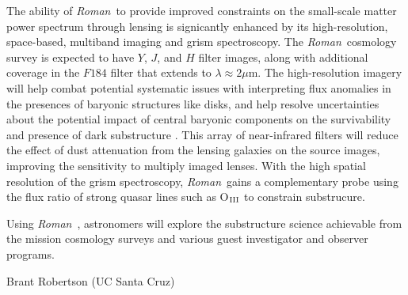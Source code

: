 \documentclass[11pt]{article}
\newcommand{\RST}{\emph{Roman}~}
\begin{document}
The ability of \RST to provide improved constraints on the small-scale matter power spectrum
through lensing is signicantly enhanced by its high-resolution, space-based, multiband imaging
and grism spectroscopy. The \RST cosmology survey is expected to have $Y$, $J$, and $H$ filter
images, along with additional coverage in the $F184$ filter that extends to $\lambda\approx2\mu$m.
The high-resolution imagery will help combat potential systematic issues with interpreting
flux anomalies in the presences of baryonic structures like disks\citep{hsueh2017a}, and
help resolve uncertainties about the potential impact of central baryonic components on the
survivability and presence of dark substructure \citep{garrison-kimmel2017a,graus2018a}.
This array of near-infrared filters will reduce the effect of dust attenuation from the lensing
galaxies on the source images, improving the sensitivity to multiply imaged lenses. With the
high spatial resolution of the
grism spectroscopy, \RST gains a complementary probe using the flux ratio of strong quasar lines
such as O$_{\rm{III}}$ to constrain substrucure\citep{nierenberg2017a}.

Using \RST, astronomers
will explore the substructure science achievable from the mission cosmology surveys and various 
guest investigator and observer programs.

\clearpage

\noindent %


\def\apj{\it{ApJ}}                  
\def\apjl{\it{ApJL}}
\def\araa{\it{ARAA}}
\def\mnras{\it{MNRAS}}
\def\nat{\it{Nature}}
\def\prd{\it{Phys. Rev. D}}
\def\prl{\it{Phys. Rev. Lett.}}





\vspace{4in}


Brant Robertson (UC Santa Cruz)
\end{document}
